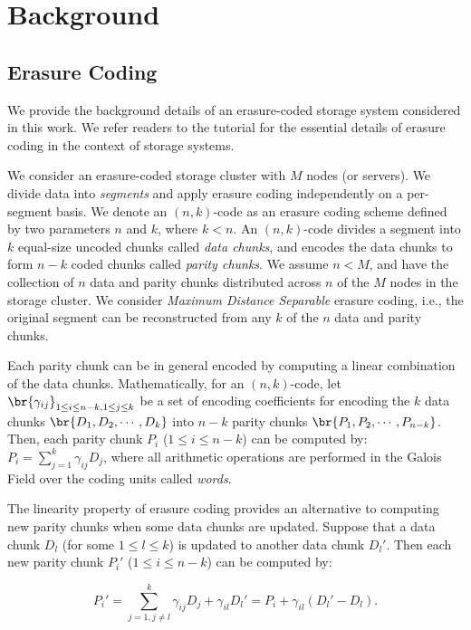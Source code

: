 \chapter{Background}
\label{chap:background}

\section{Erasure Coding}
\label{sec:ec_background}

We provide the background details of an erasure-coded storage system
considered in this work. We refer readers to the tutorial \cite{plank13} 
for the essential details of erasure coding in the context of storage systems. 

We consider an erasure-coded storage cluster with $M$ nodes (or servers).  We
divide data into {\em segments} and apply erasure coding independently on a
per-segment basis.  We denote an $(n,k)$-code as an erasure coding scheme
defined by two parameters $n$ and $k$, where $k<n$.  An $(n,k)$-code divides a
segment into $k$ equal-size uncoded chunks called {\em data chunks}, and
encodes the data chunks to form $n-k$ coded chunks called {\em parity chunks}.
We assume $n < M$, and have the collection of $n$ data and parity chunks
distributed across $n$ of the $M$ nodes in the storage cluster.  We consider
{\em Maximum Distance Separable} erasure coding, i.e., the original segment
can be reconstructed from any $k$ of the $n$ data and parity chunks. 

Each parity chunk can be in general encoded by computing a linear combination
of the data chunks.  Mathematically, for an $(n,k)$-code, let
$\br{\gamma_{ij}}_{1\le i\le n-k, 1\le j\le k}$ be a set of encoding
coefficients for encoding the $k$ data chunks $\br{D_1, D_2,\cdots,D_k}$ into
$n-k$ parity chunks $\br{P_1,P_2,\cdots,P_{n-k}}$.  Then, each parity chunk
$P_i$ ($1\le i\le n-k$) can be computed by:
$P_i = \sum_{j=1}^{k} \gamma_{ij} D_j$, 
where all arithmetic operations are performed in the Galois Field over the
coding units called {\em words}. 

The linearity property of erasure coding provides an alternative to computing
new parity chunks when some data chunks are updated.  Suppose that a data
chunk $D_l$ (for some $1\le l\le k$) is updated to another data chunk $D_l'$. 
Then each new parity chunk $P_i'$ ($1\le i\le n-k$) can be computed by:

\begin{equation*}
P_i' = \sum_{j=1,j\ne l}^{k} \gamma_{ij} D_j + \gamma_{il} D_l' 
= P_i + \gamma_{il}(D_l' - D_l). 
\end{equation*}

